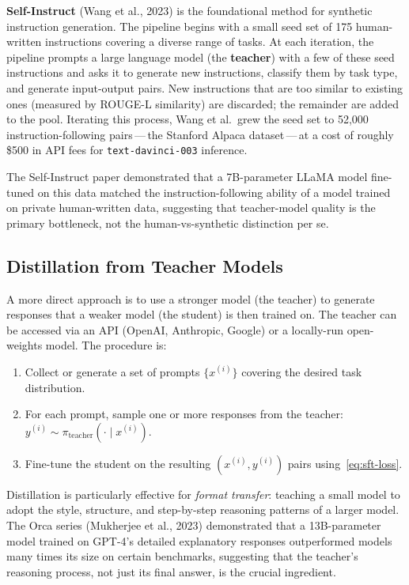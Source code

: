 \textbf{Self-Instruct} (Wang et al., 2023) is the foundational method for synthetic instruction generation. The pipeline begins with a small seed set of 175 human-written instructions covering a diverse range of tasks. At each iteration, the pipeline prompts a large language model (the \textbf{teacher}) with a few of these seed instructions and asks it to generate new instructions, classify them by task type, and generate input-output pairs. New instructions that are too similar to existing ones (measured by ROUGE-L similarity) are discarded; the remainder are added to the pool. Iterating this process, Wang et al.\ grew the seed set to 52{,}000 instruction-following pairs\,---\,the Stanford Alpaca dataset\,---\,at a cost of roughly \$500 in API fees for \texttt{text-davinci-003} inference.

The Self-Instruct paper demonstrated that a 7B-parameter LLaMA model fine-tuned on this data matched the instruction-following ability of a model trained on private human-written data, suggesting that teacher-model quality is the primary bottleneck, not the human-vs-synthetic distinction per se.

\subsection{Distillation from Teacher Models}

A more direct approach is to use a stronger model (the teacher) to generate responses that a weaker model (the student) is then trained on. The teacher can be accessed via an API (OpenAI, Anthropic, Google) or a locally-run open-weights model. The procedure is:

\begin{enumerate}[leftmargin=*]
  \item Collect or generate a set of prompts $\{x^{(i)}\}$ covering the desired task distribution.
  \item For each prompt, sample one or more responses from the teacher: $y^{(i)} \sim \pi_{\mathrm{teacher}}(\cdot \mid x^{(i)})$.
  \item Fine-tune the student on the resulting $(x^{(i)}, y^{(i)})$ pairs using~\eqref{eq:sft-loss}.
\end{enumerate}

Distillation is particularly effective for \emph{format transfer}: teaching a small model to adopt the style, structure, and step-by-step reasoning patterns of a larger model. The Orca series (Mukherjee et al., 2023) demonstrated that a 13B-parameter model trained on GPT-4's detailed explanatory responses outperformed models many times its size on certain benchmarks, suggesting that the teacher's reasoning process, not just its final answer, is the crucial ingredient.

